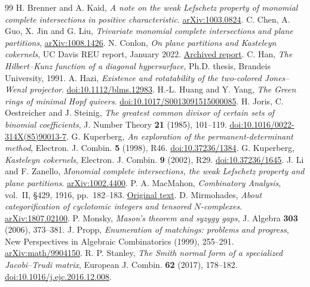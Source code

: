 \documentclass[11pt]{article}
\begin{document}
\begingroup
\small
\raggedright
\begin{thebibliography}{99}
 H. Brenner and A. Kaid, \emph{A note on the weak Lefschetz
property of monomial complete intersections in positive characteristic}.
\href{https://arxiv.org/abs/1003.0824}{arXiv:1003.0824}.
 C. Chen, A. Guo, X. Jin and G. Liu,
\emph{Trivariate monomial complete intersections and plane partitions},
\href{https://arxiv.org/abs/1008.1426}{arXiv:1008.1426}.
 N. Conlon, \emph{On plane partitions and Kasteleyn
cokernels}, UC Davis REU report, January 2022.
\href{https://web.archive.org/web/20220629185444id_/https://reu.math.ucdavis.edu/application/files/8416/5146/0704/conlon-report.pdf}{Archived report}.
 C. Han, \emph{The Hilbert--Kunz function of a diagonal
hypersurface}, Ph.D. thesis, Brandeis University, 1991.
 A. Hazi, \emph{Existence and rotatability of the
two-colored Jones--Wenzl projector}.
\href{https://doi.org/10.1112/blms.12983}{doi:10.1112/blms.12983}.
 H.-L. Huang and Y. Yang, \emph{The Green rings of minimal
Hopf quivers}. \href{https://doi.org/10.1017/S0013091515000085}{doi:10.1017/S0013091515000085}.
 H. Joris, C. Oestreicher and J. Steinig,
\emph{The greatest common divisor of certain sets of binomial coefficients},
J. Number Theory \textbf{21} (1985), 101--119.
\href{https://doi.org/10.1016/0022-314X(85)90013-7}{doi:10.1016/0022-314X(85)90013-7}.
 G. Kuperberg, \emph{An exploration of the
permanent-determinant method}, Electron. J. Combin. \textbf{5} (1998), R46.
\href{https://doi.org/10.37236/1384}{doi:10.37236/1384}.
 G. Kuperberg, \emph{Kasteleyn cokernels},
Electron. J. Combin. \textbf{9} (2002), R29.
\href{https://doi.org/10.37236/1645}{doi:10.37236/1645}.
 J. Li and F. Zanello, \emph{Monomial complete intersections,
the weak Lefschetz property and plane partitions}.
\href{https://arxiv.org/abs/1002.4400}{arXiv:1002.4400}.
 P. A. MacMahon, \emph{Combinatory Analysis},
vol.~II, \S429, 1916, pp.~182--183.
\href{https://archive.org/details/combinatoryanaly02macmuoft/page/182/mode/2up}{Original text}.
 D. Mirmohades, \emph{About categorification of
cyclotomic integers and tensored \(N\)-complexes}.
\href{https://arxiv.org/abs/1807.02100}{arXiv:1807.02100}.
 P. Monsky, \emph{Mason's theorem and syzygy gaps},
J. Algebra \textbf{303} (2006), 373--381.
 J. Propp, \emph{Enumeration of matchings: problems and
progress}, New Perspectives in Algebraic Combinatorics (1999), 255--291.
\href{https://arxiv.org/abs/math/9904150}{arXiv:math/9904150}.
 R. P. Stanley, \emph{The Smith normal form of a
specialized Jacobi--Trudi matrix}, European J. Combin. \textbf{62}
(2017), 178--182. \href{https://doi.org/10.1016/j.ejc.2016.12.008}{doi:10.1016/j.ejc.2016.12.008}.
\end{thebibliography}
\endgroup
\end{document}
